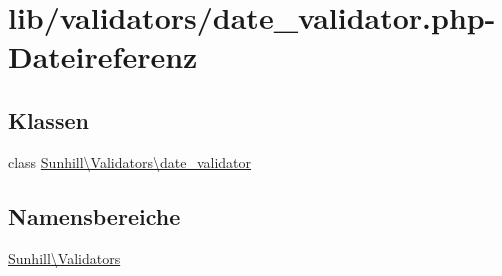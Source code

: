 \hypertarget{date__validator_8php}{}\section{lib/validators/date\+\_\+validator.php-\/\+Dateireferenz}
\label{date__validator_8php}
\subsection*{Klassen}
\begin{DoxyCompactItemize}
\item 
class \hyperlink{classSunhill_1_1Validators_1_1date__validator}{Sunhill\textbackslash{}\+Validators\textbackslash{}date\+\_\+validator}
\end{DoxyCompactItemize}
\subsection*{Namensbereiche}
\begin{DoxyCompactItemize}
\item 
 \hyperlink{namespaceSunhill_1_1Validators}{Sunhill\textbackslash{}\+Validators}
\end{DoxyCompactItemize}
